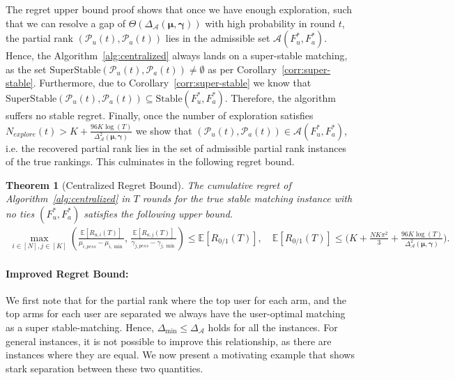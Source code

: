\documentclass{article}
\newtheorem{theorem}{Theorem}[section]
\begin{document}
The regret upper bound proof shows that once we have enough exploration, such that we can resolve a gap of $\Theta(\Delta_{\mathcal{A}}(\boldsymbol{\mu}, \boldsymbol{\gamma}))$ with high probability in round $t$, the partial rank $(\mathcal{P}_{u}(t), \mathcal{P}_{a}(t))$ lies in the admissible set $\mathcal{A}(F^*_{u}, F^*_{a})$. Hence, the Algorithm~\ref{alg:centralized} always lands on a super-stable matching, as the set $\mathrm{SuperStable}(\mathcal{P}_{u}(t), \mathcal{P}_{a}(t)) \neq \emptyset$ as per Corollary~\ref{corr:super-stable}. Furthermore, due to Corollary~\ref{corr:super-stable} we know that $\mathrm{SuperStable}(\mathcal{P}_{u}(t), \mathcal{P}_{a}(t)) \subseteq \mathrm{Stable}(F^{*}_{u}, F^{*}_{a})$. Therefore, the algorithm suffers no stable regret. Finally, once the number of exploration satisfies $N_{explore}(t) > K + \frac{96K\log(T)}{\Delta^2_{\mathcal{A}}(\boldsymbol{\mu}, \boldsymbol{\gamma})}$ we show that $(\mathcal{P}_{u}(t), \mathcal{P}_{a}(t)) \in \mathcal{A}(F^*_{u}, F^*_{a})$, i.e. the recovered partial rank lies in the set of admissible partial rank instances of the true rankings. This culminates in the following regret bound.
\begin{theorem}[Centralized Regret Bound]
\label{thm:centralized_main}
    The cumulative regret of Algorithm~\ref{alg:centralized} in $T$ rounds for the true stable matching instance with no ties $(F^*_{u}, F^*_{a})$ satisfies the following upper bound. 
    \begin{gather*}
     \max_{i \in [N], j \in [K]}\left(\tfrac{\mathbb{E}[R_{u,i}(T)]}{\mu_{i,pess} - \mu_{i, \min}},\, \tfrac{\mathbb{E}[R_{a,j}(T)]}{\gamma_{j,pess} - \gamma_{j, \min}}\right) \leq \mathbb{E}[R_{0/1}(T)],\quad
     \mathbb{E}[R_{0/1}(T)] \leq  
     \Big(K + \frac{NK \pi^2}{3} +  \frac{96 K\log(T)}{\Delta^2_{\mathcal{A}}(\boldsymbol{\mu}, \boldsymbol{\gamma})}\Big).
    \end{gather*}
\end{theorem}
 \paragraph{Improved Regret Bound:}
 We first note that for the partial rank where the top 
 user for each arm, and the top 
 arms for each user are separated we always have the user-optimal matching as a super stable-matching. Hence, $\Delta_{\min} \leq \Delta_{\mathcal{A}}$
 holds for all the instances. For general instances, it is not possible to improve this relationship, as there are instances where they are equal. We now present a motivating example that shows stark separation between these two quantities.
\end{document}
